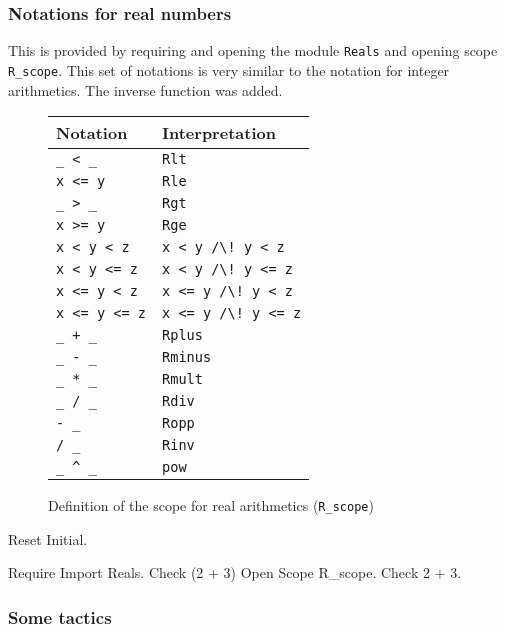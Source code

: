 \subsubsection[Notations for real numbers]{Notations for real numbers}

This is provided by requiring and opening the module {\tt Reals} and
opening scope {\tt R\_scope}. This set of notations is very similar to
the notation for integer arithmetics. The inverse function was added.
\begin{figure}
\begin{center}
\begin{tabular}{l|l}
Notation & Interpretation \\
\hline
\verb!_ < _! & {\tt Rlt} \\
\verb!x <= y! & {\tt Rle} \\
\verb!_ > _! & {\tt Rgt} \\
\verb!x >= y! & {\tt Rge} \\
\verb!x < y < z! & {\tt x < y \verb!/\! y < z} \\
\verb!x < y <= z! & {\tt x < y \verb!/\! y <= z} \\
\verb!x <= y < z! & {\tt x <= y \verb!/\! y < z} \\
\verb!x <= y <= z! & {\tt x <= y \verb!/\! y <= z} \\
\verb!_ + _! & {\tt Rplus} \\
\verb!_ - _! & {\tt Rminus} \\
\verb!_ * _! & {\tt Rmult} \\
\verb!_ / _! & {\tt Rdiv} \\
\verb!- _!  & {\tt Ropp} \\
\verb!/ _!  & {\tt Rinv} \\
\verb!_ ^ _! & {\tt pow} \\
\end{tabular}
\end{center}
\label{reals-syntax}
\caption{Definition of the scope for real arithmetics ({\tt R\_scope})}
\end{figure}

\begin{coq_eval}
Reset Initial.
\end{coq_eval}
\begin{coq_example}
Require Import Reals.
Check  (2 + 3)%
Open Scope R_scope.
Check 2 + 3.
\end{coq_example}

\subsubsection{Some tactics}

